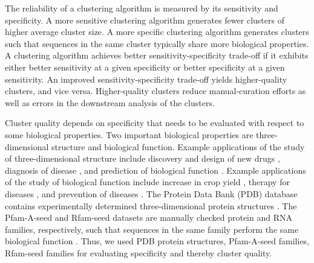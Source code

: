 \documentclass[11pt,letterpaper]{article}
\begin{document}

The reliability of a clustering algorithm is measured by its sensitivity and specificity.
A more sensitive clustering algorithm generates fewer clusters of higher average cluster size.
A more specific clustering algorithm generates clusters such that sequences in the same cluster typically share more biological properties.
A clustering algorithm achieves better sensitivity-specificity trade-off if it exhibits either better sensitivity at a given specificity or better specificity at a given sensitivity.
An improved sensitivity-specificity trade-off yields higher-quality clusters, and vice versa.
Higher-quality clusters reduce manual-curation efforts as well as errors in the downstream analysis of the clusters.

Cluster quality depends on specificity that needs to be evaluated with respect to some biological properties.
Two %
important biological properties are three-dimensional structure and biological function.
Example applications of the study of three-dimensional structure include
discovery and design of new drugs  \citep{kryger1999structure}, 
diagnosis of disease \citep{gniadecka2004melanoma}, and
prediction of biological function \citep{berg2002protein}.
Example applications of the study of biological function include
increase in crop yield \citep{xu2011functions},
therapy for diseases \citep{cowen2009harnessing,egen2002ctla}, and
prevention of diseases \citep{kris2004bioactive}.
The Protein Data Bank (PDB) database contains experimentally determined three-dimensional protein structures \cite{berman2006protein}.
The Pfam-A-seed and Rfam-seed datasets are manually checked protein and RNA families, respectively, such that sequences in the same family perform the same biological function \citep{finn2016pfam,nawrocki2014rfam}.
Thus, we used PDB protein structures, Pfam-A-seed families,  Rfam-seed families for evaluating specificity and thereby cluster quality.
\end{document}
